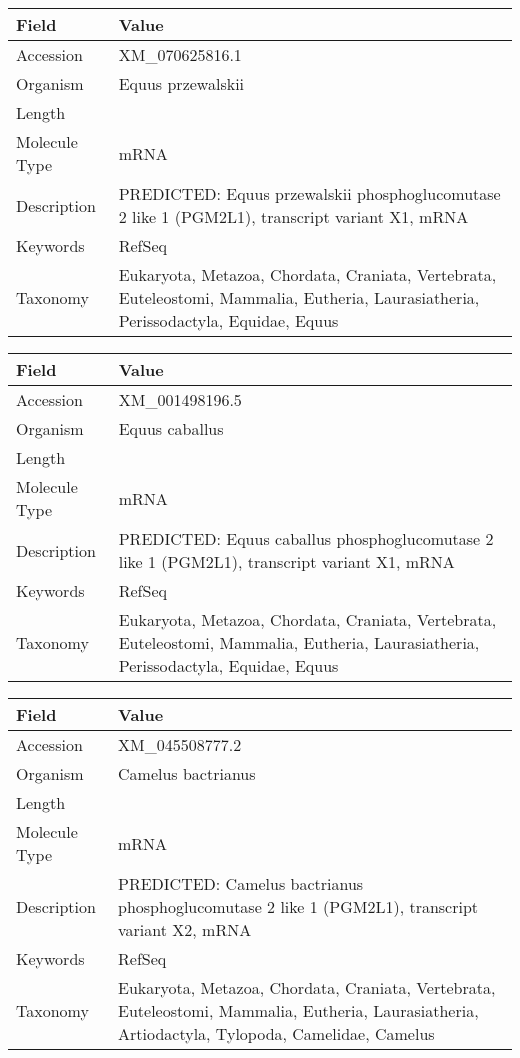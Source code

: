 \documentclass[10pt]{article}
\begin{document}
\vspace{1em}
{\footnotesize
\begin{longtable}{>{\raggedright\arraybackslash}p{4.5cm} >{\raggedright\arraybackslash}p{11.5cm}}
\textbf{Field} & \textbf{Value} \\
\hline
Accession & XM\_070625816.1 \\
Organism & Equus przewalskii \\
Length & 4848 \\
Molecule Type & mRNA \\
Description & PREDICTED: Equus przewalskii phosphoglucomutase 2 like 1 (PGM2L1), transcript variant X1, mRNA \\
Keywords & RefSeq \\
Taxonomy & Eukaryota, Metazoa, Chordata, Craniata, Vertebrata, Euteleostomi, Mammalia, Eutheria, Laurasiatheria, Perissodactyla, Equidae, Equus \\
\end{longtable}
}

\vspace{1em}
{\footnotesize
\begin{longtable}{>{\raggedright\arraybackslash}p{4.5cm} >{\raggedright\arraybackslash}p{11.5cm}}
\textbf{Field} & \textbf{Value} \\
\hline
Accession & XM\_001498196.5 \\
Organism & Equus caballus \\
Length & 4846 \\
Molecule Type & mRNA \\
Description & PREDICTED: Equus caballus phosphoglucomutase 2 like 1 (PGM2L1), transcript variant X1, mRNA \\
Keywords & RefSeq \\
Taxonomy & Eukaryota, Metazoa, Chordata, Craniata, Vertebrata, Euteleostomi, Mammalia, Eutheria, Laurasiatheria, Perissodactyla, Equidae, Equus \\
\end{longtable}
}

\vspace{1em}
{\footnotesize
\begin{longtable}{>{\raggedright\arraybackslash}p{4.5cm} >{\raggedright\arraybackslash}p{11.5cm}}
\textbf{Field} & \textbf{Value} \\
\hline
Accession & XM\_045508777.2 \\
Organism & Camelus bactrianus \\
Length & 7230 \\
Molecule Type & mRNA \\
Description & PREDICTED: Camelus bactrianus phosphoglucomutase 2 like 1 (PGM2L1), transcript variant X2, mRNA \\
Keywords & RefSeq \\
Taxonomy & Eukaryota, Metazoa, Chordata, Craniata, Vertebrata, Euteleostomi, Mammalia, Eutheria, Laurasiatheria, Artiodactyla, Tylopoda, Camelidae, Camelus \\
\end{longtable}
}
\end{document}
